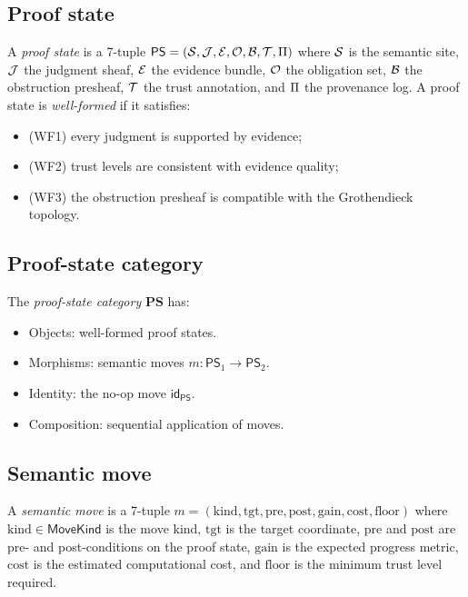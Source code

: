 \documentclass[11pt]{article}
\newcommand{\PS}{\mathsf{PS}}
\newcommand{\PScat}{\mathbf{PS}}
\newcommand{\pre}{\mathrm{pre}}
\newcommand{\post}{\mathrm{post}}
\newcommand{\gain}{\mathrm{gain}}
\newcommand{\cost}{\mathrm{cost}}
\newcommand{\floor}{\mathrm{floor}}
\newcommand{\kind}{\mathrm{kind}}
\newcommand{\target}{\mathrm{tgt}}
\newcommand{\MoveKind}{\mathsf{MoveKind}}
\begin{document}
\subsection{Proof state}

\begin{definition}\label{def:proof-state}
A \emph{proof state} is a 7-tuple
$\PS = (\Site, \J, \evid, \oblig, \obstr, \trust, \prov)$
where $\mathcal{S}$ is the semantic site, $\mathcal{J}$ the judgment sheaf,
$\mathcal{E}$ the evidence bundle, $\mathcal{O}$ the obligation set,
$\mathcal{B}$ the obstruction presheaf, $\mathcal{T}$ the trust annotation,
and $\Pi$ the provenance log.
A proof state is \emph{well-formed} if it satisfies:
\begin{itemize}[nosep]
  \item (WF1) every judgment is supported by evidence;
  \item (WF2) trust levels are consistent with evidence quality;
  \item (WF3) the obstruction presheaf is compatible with the
        Grothendieck topology.
\end{itemize}
\end{definition}

\subsection{Proof-state category}

\begin{definition}\label{def:ps-cat}
The \emph{proof-state category} $\PScat$ has:
\begin{itemize}[nosep]
  \item Objects: well-formed proof states.
  \item Morphisms: semantic moves $m: \PS_1 \to \PS_2$.
  \item Identity: the no-op move $\mathsf{id}_\PS$.
  \item Composition: sequential application of moves.
\end{itemize}
\end{definition}

\subsection{Semantic move}

\begin{definition}\label{def:move}
A \emph{semantic move} is a 7-tuple
$m = (\kind, \target, \pre, \post, \gain, \cost, \floor)$
where $\kind \in \MoveKind$ is the move kind,
$\target$ is the target coordinate,
$\pre$ and $\post$ are pre- and post-conditions on the proof state,
$\gain$ is the expected progress metric,
$\cost$ is the estimated computational cost, and
$\floor$ is the minimum trust level required.
\end{definition}
\end{document}
